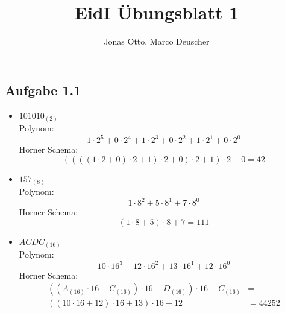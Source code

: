 \documentclass{article}
\begin{document}
  \title{EidI Übungsblatt 1}
  \author{Jonas Otto, Marco Deuscher}

  \maketitle

  \section{}
    \subsection{Aufgabe 1.1}
      \begin{itemize}
        \item $101010_{(2)}$\\
          Polynom:
          \begin{equation}
            1 \cdot 2^5 + 0 \cdot 2^4 + 1 \cdot 2^3 + 0 \cdot 2^2 + 1 \cdot 2^1 + 0 \cdot 2^0
          \end{equation}
          Horner Schema:
          \begin{equation}
            ((((1 \cdot 2 + 0) \cdot 2 + 1) \cdot 2 + 0) \cdot 2 + 1 ) \cdot 2 + 0 = 42
          \end{equation}
        \item $157_{(8)}$\\
          Polynom:
          \begin{equation}
            1 \cdot 8^2 + 5 \cdot 8^1 + 7 \cdot 8^0
          \end{equation}
          Horner Schema:
          \begin{equation}
            (1 \cdot 8 + 5) \cdot 8 + 7 = 111
          \end{equation}
        \item $ACDC_{(16)}$\\
          Polynom:
          \begin{equation}
            10 \cdot 16^3 + 12 \cdot 16^2 + 13 \cdot 16^1 + 12 \cdot 16^0
          \end{equation}
          Horner Schema:
          \begin{equation}
            \begin{aligned}
              ((A_{(16)} \cdot 16 + C_{(16)}) \cdot 16 + D_{(16)}) \cdot 16 + C_{(16)} &=\\
              ((10 \cdot 16 + 12) \cdot 16 + 13) \cdot 16 + 12 &= 44252
            \end{aligned}

\end{equation}
\end{itemize}
\end{document}
